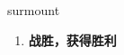 
\begin{frame}
{\huge surmount}
\begin{center}
\begin{enumerate}\Large
  \item \textbf{战胜，获得胜利}
\end{enumerate}
\end{center}
\end{frame}
